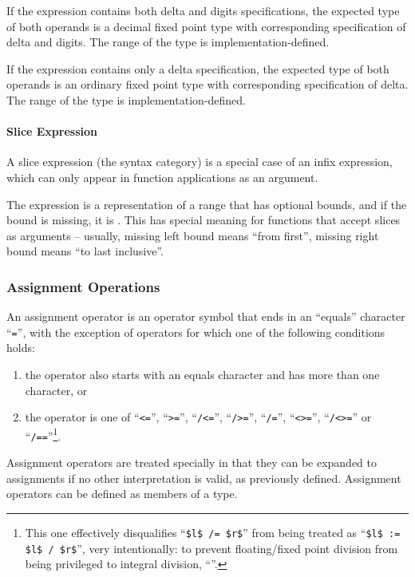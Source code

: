 If the expression contains both delta and digits specifications, the expected type of both operands is a decimal fixed point type with corresponding specification of delta and digits. The range of the type is implementation-defined. 

If the expression contains only a delta specification, the expected type of both operands is an ordinary fixed point type with corresponding specification of delta. The range of the type is implementation-defined. 




\paragraph{Slice Expression}
A slice expression (the  syntax category) is a special case of an infix expression, which can only appear in function applications as an argument. 

The expression is a representation of a range that has optional bounds, and if the bound is missing, it is . This has special meaning for functions that accept slices as arguments -- usually, missing left bound means ``from first'', missing right bound means ``to last inclusive''. 




\subsubsection{Assignment Operations}
\label{sec:assignment-operations}

An assignment operator is an operator symbol that ends in an ``equals'' character ``\lstinline!=!'', with the exception of operators for which one of the following conditions holds: 
\begin{enumerate}
  \item the operator also starts with an equals character and has more than one character, or
  \item the operator is one of ``\lstinline!<=!'', ``\lstinline!>=!'', ``\lstinline!/<=!'', ``\lstinline!/>=!'', ``\lstinline!/=!'', ``\lstinline!<>=!'', ``\lstinline!/<>=!'' or ``\lstinline!/==!''\footnote{This one effectively disqualifies ``\lstinline!$l$ /= $r$!'' from being treated as ``\lstinline!$l$ := $l$ / $r$!'', very intentionally: to prevent floating/fixed point division from being privileged to integral division, ``''.}.
\end{enumerate}

Assignment operators are treated specially in that they can be expanded to assignments if no other interpretation is valid, as previously defined. Assignment operators can be defined as members of a type. 

